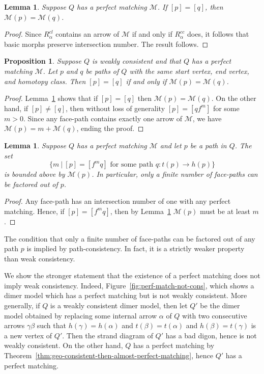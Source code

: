 \documentclass{article}
\newtheorem{prop}[thm]{Proposition}
\newtheorem{lemma}[thm]{Lemma}
\theoremstyle{definition}
\begin{document}
\begin{lemma}\label{lem:perfect-matching-intersection-num}
	Suppose $Q$ has a perfect matching $\mathcal M$. If $[p]=[q]$, then $\mathcal M(p)=\mathcal M(q)$.
\end{lemma}
\begin{proof}
	Since $R_\alpha^{cl}$ contains an arrow of $\mathcal M$ if and only if $R_\alpha^{cc}$ does, it follows that basic morphs preserve intersection number. The result follows.
\end{proof}

\begin{prop}\label{prop:perfect-matching-intersection-num}
	Suppose $Q$ is weakly consistent and that $Q$ has a perfect matching $\mathcal M$. Let $p$ and $q$ be paths of $Q$ with the same start vertex, end vertex, and homotopy class. Then $[p]=[q]$ if and only if $\mathcal M(p)=\mathcal M(q)$.
\end{prop}
\begin{proof}
	Lemma~\ref{lem:perfect-matching-intersection-num} shows that if $[p]=[q]$ then $\mathcal M(p)=\mathcal M(q)$. On the other hand, if $[p]\neq[q]$, then without loss of generality $[p]=[qf^m]$ for some $m>0$. Since any face-path contains exactly one arrow of $\mathcal M$, we have $\mathcal M(p)=m+\mathcal M(q)$, ending the proof.
\end{proof}

\begin{lemma}\label{lem:perfect-matching-factor-out-finite}
	Suppose $Q$ has a perfect matching $\mathcal M$ and let $p$ be a path in $Q$.
	The set
	\[\{m\ |\ [p]=[f^mq]\textrm{ for some path }q:t(p)\to h(p)\}\]
	is bounded above by $\mathcal M(p)$. In particular, only a finite number of face-paths can be factored out of $p$.
\end{lemma}
\begin{proof}
	Any face-path has an intersection number of one with any perfect matching. Hence, if $[p]=[f^mq]$, then by Lemma~\ref{lem:perfect-matching-intersection-num} $\mathcal M(p)$ must be at least $m$.
\end{proof}

The condition that only a finite number of face-paths can be factored out of any path $p$ is implied by path-consistency. In fact, it is a strictly weaker property than weak consistency. 

We show the stronger statement that the existence of a perfect matching does not imply weak consistency. Indeed, Figure~\ref{fig:perf-match-not-cons}, which shows a dimer model which has a perfect matching but is not weakly consistent.
More generally, if $Q$ is a weakly consistent dimer model, then let $Q'$ be the dimer model obtained by replacing some internal arrow $\alpha$ of $Q$ with two consecutive arrows $\gamma\beta$ such that $h(\gamma)=h(\alpha)$ and $t(\beta)=t(\alpha)$ and $h(\beta)=t(\gamma)$ is a new vertex of $Q'$. Then the strand diagram of $Q'$ has a bad digon, hence is not weakly consistent. On the other hand, $Q$ has a perfect matching by Theorem~\ref{thm:geo-consistent-then-almost-perfect-matching}, hence $Q'$ has a perfect matching.
\end{document}
